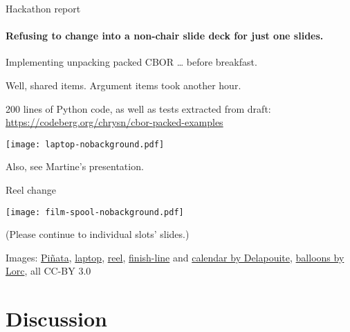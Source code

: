 \documentclass[aspectratio=169]{beamer}
\begin{document}
\begin{frame}{Hackathon report}\large
    \framesubtitle{Refusing to change into a non-chair slide deck for just one slides.}
    Implementing unpacking packed CBOR \ldots{} before breakfast.

    \bigskip

    Well, shared items. Argument items took another hour.

    \bigskip

    200 lines of Python code, as well as tests extracted from draft:
    \url{https://codeberg.org/chrysn/cbor-packed-examples}

    \begin{block}{\texttt{[image: laptop-nobackground.pdf]}\mbox{\quad}}
    \end{block}

    \raggedleft Also, see Martine's presentation.
\end{frame}

\begin{frame}{Reel change}
    \begin{block}{\texttt{[image: film-spool-nobackground.pdf]}\mbox{\quad}}
        \mbox{}

        \vspace{-1.7cm}

        (Please continue to individual slots' slides.)
    \end{block}

    \vfill
    \tiny Images:
    \href{https://game-icons.net/1x1/delapouite/pinata.html}{Piñata},
    \href{https://game-icons.net/1x1/delapouite/laptop.html}{laptop},
    \href{https://game-icons.net/1x1/delapouite/film-spool.html}{reel},
    \href{https://game-icons.net/1x1/delapouite/finish-line.html}{finish-line} and
    \href{https://game-icons.net/1x1/delapouite/calendar.html}{calendar by Delapouite},
    \href{https://game-icons.net/1x1/lorc/balloons.html}{balloons by Lorc},
    all CC-BY 3.0
\end{frame}

\section*{Discussion}
\end{document}
